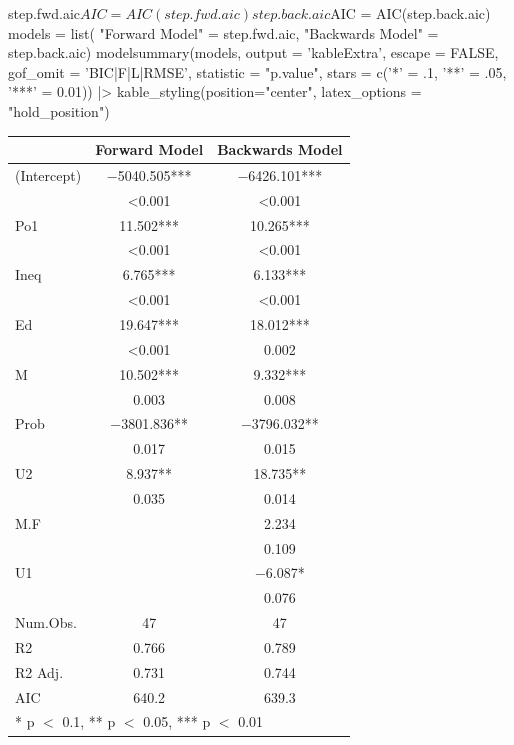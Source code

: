 \documentclass[a4paper]{article}\usepackage[]{graphicx}\usepackage[]{xcolor}
\begin{document}
\begin{Schunk}
\begin{Sinput}
step.fwd.aic$AIC = AIC(step.fwd.aic)
step.back.aic$AIC = AIC(step.back.aic)
models = list(
	"Forward Model" = step.fwd.aic,
	"Backwards Model" = step.back.aic)
modelsummary(models, output = 'kableExtra', escape = FALSE, gof_omit = 'BIC|F|L|RMSE', statistic = "{p.value}", stars = c('*' = .1, '**' = .05, '***' = 0.01)) |>
  kable_styling(position="center", latex_options = "hold_position")
\end{Sinput}
\begin{table}[!h]
\centering
\begin{tabular}[t]{lcc}
\toprule
  & Forward Model & Backwards Model\\
\midrule
(Intercept) & \num{-5040.505}*** & \num{-6426.101}***\\
 & \num{<0.001} & \vphantom{2} \num{<0.001}\\
Po1 & \num{11.502}*** & \num{10.265}***\\
 & \num{<0.001} & \vphantom{1} \num{<0.001}\\
Ineq & \num{6.765}*** & \num{6.133}***\\
 & \num{<0.001} & \num{<0.001}\\
Ed & \num{19.647}*** & \num{18.012}***\\
 & \num{<0.001} & \num{0.002}\\
M & \num{10.502}*** & \num{9.332}***\\
 & \num{0.003} & \num{0.008}\\
Prob & \num{-3801.836}** & \num{-3796.032}**\\
 & \num{0.017} & \num{0.015}\\
U2 & \num{8.937}** & \num{18.735}**\\
 & \num{0.035} & \num{0.014}\\
M.F &  & \num{2.234}\\
 &  & \num{0.109}\\
U1 &  & \num{-6.087}*\\
 &  & \num{0.076}\\
\midrule
Num.Obs. & \num{47} & \num{47}\\
R2 & \num{0.766} & \num{0.789}\\
R2 Adj. & \num{0.731} & \num{0.744}\\
AIC & \num{640.2} & \num{639.3}\\
\bottomrule
\multicolumn{3}{l}{\rule{0pt}{1em}* p $<$ 0.1, ** p $<$ 0.05, *** p $<$ 0.01}\\
\end{tabular}
\end{table}

\end{Schunk}
\end{document}

